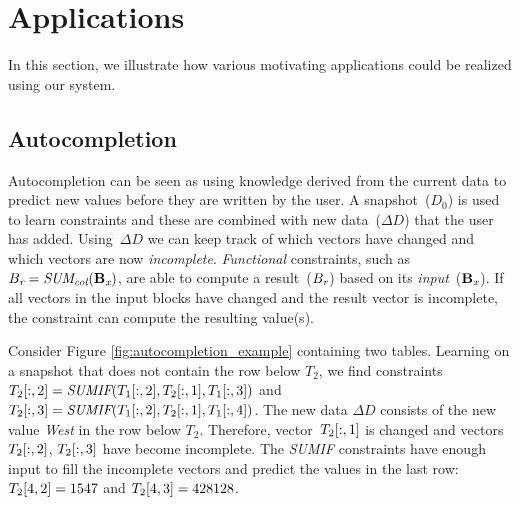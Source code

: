 \section{Applications}\label{sec:applications}
In this section, we illustrate how various motivating applications could be realized using our system.





\subsection{Autocompletion}
Autocompletion can be seen as using knowledge derived from the current data to predict new values before they are written by the user.
A snapshot~($D_0$) is used to learn constraints and these are combined with new data~($\Delta D$) that the user has added.
Using~$\Delta D$ we can keep track of which vectors have changed and which vectors are now \textit{incomplete}.
\textit{Functional} constraints, such as $B_{\textit{r}} = \textit{SUM\textsubscript{col}}(\mathbf{B_{\textit{x}}})$, are able to compute a result~($B_{\textit{r}}$) based on its \textit{input}~($\mathbf{B_{\textit{x}}}$).
If all vectors in the input blocks have changed and the result vector is incomplete, the constraint can compute the resulting value(s).

Consider Figure \ref{fig:autocompletion_example} containing two tables.
Learning on a snapshot that does not contain the row below $T_2$, we find constraints $T_2[:,2] = \textit{SUMIF}(T_1[:,2], T_2[:,1], T_1[:,3])$ and $T_2[:,3] = \textit{SUMIF}(T_1[:,2], T_2[:,1], T_1[:,4])$.
The new data $\Delta D$ consists of the new value \textit{West} in the row below $T_2$.
Therefore, vector~$T_2[:,1]$ is changed and vectors~$T_2[:,2]$, $T_2[:,3]$ have become incomplete.
The \textit{SUMIF} constraints have enough input to fill the incomplete vectors and predict the values in the last row: $T_2[4,2] = 1547$ and $T_2[4,3] = 428128$.


